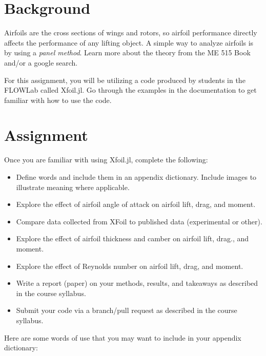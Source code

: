 \documentclass[12pt]{article}
\begin{document}
	
	\section{Background}
	
	Airfoils are the cross sections of wings and rotors, so airfoil performance directly affects the performance of any lifting object.
	A simple way to analyze airfoils is by using a \textit{panel method}. 
	Learn more about the theory from the ME 515 Book and/or a google search.
	
	For this assignment, you will be utilizing a code produced by students in the FLOWLab called Xfoil.jl.
	Go through the examples in the documentation to get familiar with how to use the code.
	
	
	\section{Assignment}
	Once you are familiar with using Xfoil.jl, complete the following:
	
	\begin{itemize}
		\item Define words and include them in an appendix dictionary.  Include images to illustrate meaning where applicable. 
		\item Explore the effect of airfoil angle of attack on airfoil lift, drag, and moment.
		\item Compare data collected from XFoil to published data (experimental or other). 
		\item Explore the effect of airfoil thickness and camber on airfoil lift, drag., and moment.
		\item Explore the effect of Reynolds number on airfoil lift, drag, and moment.
		\item Write a report (paper) on your methods, results, and takeaways as described in the course syllabus.
		\item Submit your code via a branch/pull request as described in the course syllabus.
	\end{itemize}
	
	\bigskip
	
	Here are some words of use that you may want to include in your appendix dictionary:
	
\end{document}
